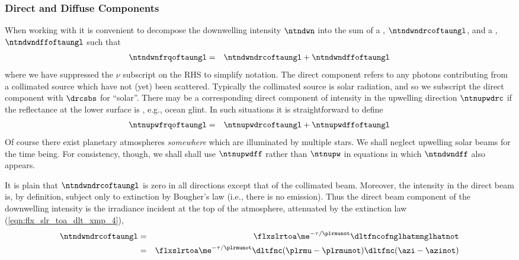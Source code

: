 \documentclass[12pt]{article}
\begin{document}
\subsubsection[Direct and Diffuse Components]{Direct and Diffuse
Components}\label{sxn:drc_dff}
When working with  it is convenient to
decompose  the downwelling intensity $\ntndwn$ into the sum of a
, $\ntndwndrcoftaungl$, and a , $\ntndwndffoftaungl$ such that 
\begin{eqnarray}
\ntndwnfrqoftaungl & = & \ntndwndrcoftaungl + \ntndwndffoftaungl
\label{eqn:ntn_frq_dwn_drc_dff}
\end{eqnarray}
where we have suppressed the $\nu$ subscript on the RHS to 
simplify notation.
The direct component refers to any photons contributing from a 
collimated source which have not (yet) been scattered.
Typically the collimated source is solar radiation, and so we
subscript the direct component with $\drcsbs$ for ``solar''.
There may be a corresponding direct component of intensity in the
upwelling direction $\ntnupwdrc$ if the reflectance at the lower
surface is , e.g., ocean glint. 
In such situations it is straightforward to define
\begin{eqnarray}
\ntnupwfrqoftaungl & = & \ntnupwdrcoftaungl + \ntnupwdffoftaungl
\label{eqn:ntn_frq_upw_drc_dff}
\end{eqnarray}
Of course there exist planetary atmospheres \textit{somewhere} which
are illuminated by multiple stars.
We shall neglect upwelling solar beams for the time being.
For consistency, though, we shall shall use $\ntnupwdff$ rather than
$\ntnupw$ in equations in which $\ntndwndff$ also appears.

It is plain that $\ntndwndrcoftaungl$ is zero in all directions except
that of the collimated beam.
Moreover, the intensity in the direct beam is, by definition, subject
only to extinction by Bougher's law (i.e., there is no emission).
Thus the direct beam component of the downwelling intensity is the 
irradiance incident at the top of the atmosphere, attenuated by the
extinction law (\ref{eqn:flx_slr_toa_dlt_xmp_4}),  
\begin{eqnarray}
\ntndwndrcoftaungl 
& = & 
\flxslrtoa \me^{-\tau/\plrmunot} \dltfncofnglhatmnglhatnot \\
& = & 
\flxslrtoa \me^{-\tau/\plrmunot} \dltfnc(\plrmu - \plrmunot) 
\dltfnc(\azi - \azinot) \nonumber
\label{eqn:ntn_dwn_drc_dfn}
\end{eqnarray}
\end{document}
